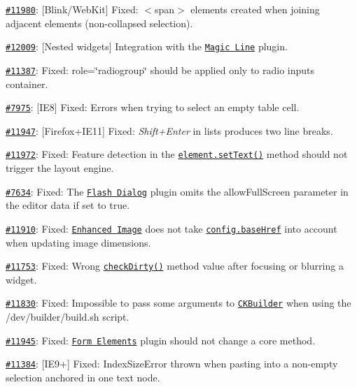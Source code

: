 \begin{DoxyItemize}
\item \href{http://dev.ckeditor.com/ticket/11980}{\tt \#11980}\+: \mbox{[}Blink/\+Web\+Kit\mbox{]} Fixed\+: {\ttfamily $<$span$>$} elements created when joining adjacent elements (non-\/collapsed selection).
\item \href{http://dev.ckeditor.com/ticket/12009}{\tt \#12009}\+: \mbox{[}Nested widgets\mbox{]} Integration with the \href{http://ckeditor.com/addon/magicline}{\tt Magic Line} plugin.
\item \href{http://dev.ckeditor.com/ticket/11387}{\tt \#11387}\+: Fixed\+: {\ttfamily role=\char`\"{}radiogroup\char`\"{}} should be applied only to radio inputs\textquotesingle{} container.
\item \href{http://dev.ckeditor.com/ticket/7975}{\tt \#7975}\+: \mbox{[}I\+E8\mbox{]} Fixed\+: Errors when trying to select an empty table cell.
\item \href{http://dev.ckeditor.com/ticket/11947}{\tt \#11947}\+: \mbox{[}Firefox+\+I\+E11\mbox{]} Fixed\+: {\itshape Shift+\+Enter} in lists produces two line breaks.
\item \href{http://dev.ckeditor.com/ticket/11972}{\tt \#11972}\+: Fixed\+: Feature detection in the \href{http://docs.ckeditor.com/#!/api/CKEDITOR.dom.element-method-setText}{\tt {\ttfamily element.\+set\+Text()}} method should not trigger the layout engine.
\item \href{http://dev.ckeditor.com/ticket/7634}{\tt \#7634}\+: Fixed\+: The \href{http://ckeditor.com/addon/flash}{\tt Flash Dialog} plugin omits the {\ttfamily allow\+Full\+Screen} parameter in the editor data if set to {\ttfamily true}.
\item \href{http://dev.ckeditor.com/ticket/11910}{\tt \#11910}\+: Fixed\+: \href{http://ckeditor.com/addon/image2}{\tt Enhanced Image} does not take \href{http://docs.ckeditor.com/#!/api/CKEDITOR.config-cfg-baseHref}{\tt {\ttfamily config.\+base\+Href}} into account when updating image dimensions.
\item \href{http://dev.ckeditor.com/ticket/11753}{\tt \#11753}\+: Fixed\+: Wrong \href{http://docs.ckeditor.com/#!/api/CKEDITOR.editor-method-checkDirty}{\tt {\ttfamily check\+Dirty()}} method value after focusing or blurring a widget.
\item \href{http://dev.ckeditor.com/ticket/11830}{\tt \#11830}\+: Fixed\+: Impossible to pass some arguments to \href{https://github.com/ckeditor/ckbuilder}{\tt C\+K\+Builder} when using the {\ttfamily /dev/builder/build.sh} script.
\item \href{http://dev.ckeditor.com/ticket/11945}{\tt \#11945}\+: Fixed\+: \href{http://ckeditor.com/addon/forms}{\tt Form Elements} plugin should not change a core method.
\item \href{http://dev.ckeditor.com/ticket/11384}{\tt \#11384}\+: \mbox{[}I\+E9+\mbox{]} Fixed\+: {\ttfamily Index\+Size\+Error} thrown when pasting into a non-\/empty selection anchored in one text node.
\end{DoxyItemize}

